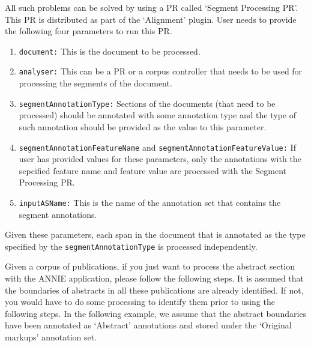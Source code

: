 All such problems can be solved by using a PR called `Segment Processing PR'.
This PR is distributed as part of the `Alignment' plugin.  User needs to 
provide the following four parameters to run this PR.

\begin{enumerate}
\item {\tt document:} This is the document to be processed.
\item {\tt analyser:} This can be a PR or a corpus controller that needs to be used for
processing the segments of the document.
\item {\tt segmentAnnotationType:} Sections of the documents (that need to be
processed) should be annotated with some annotation type and the type of such
annotation should be provided as the value to this parameter.
\item {\tt segmentAnnotationFeatureName} and {\tt segmentAnnotationFeatureValue:} 
If user has provided values for these parameters, only the annotations with the 
sepcified feature name and feature value are processed with the Segment Processing PR.
\item {\tt inputASName:} This is the name of the annotation set that contains
the segment annotations.
\end{enumerate}

Given these parameters, each span in the document that is annotated as the type
specified by the {\tt segmentAnnotationType} is processed independently.  

Given a corpus of publications, if you just want to process the abstract section
with the ANNIE application, please follow the following steps. It is assumed
that the boundaries of abstracts in all these publications are already 
identified. If not, you would have to do some processing to identify them prior 
to using the following steps. In the following example, we assume that the 
abstract boundaries have been annotated as `Abstract' annotations and stored 
under the `Original markups' annotation set.

